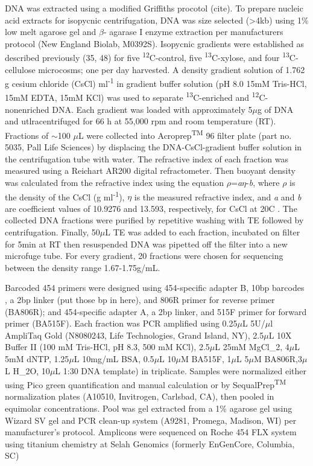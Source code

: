 DNA was extracted using a modified Griffiths procotol (cite). To prepare nucleic acid extracts for isopycnic centrifugation, DNA was size selected (>4kb) using 1\% low melt agarose gel and $\beta$- agarase I enzyme extraction per manufacturers protocol (New England Biolab, M0392S). Isopycnic gradients were established as described previously (35, 48) for five \textsuperscript{12}C-control, five \textsuperscript{13}C-xylose, and four \textsuperscript{13}C-cellulose microcosms; one per day harvested. A density gradient solution of 1.762 g cesium chloride (CsCl) ml\textsuperscript{-1} in gradient buffer solution (pH 8.0 15mM Tris-HCl, 15mM EDTA, 15mM KCl) was used to separate \textsuperscript{13}C-enriched and \textsuperscript{12}C-nonenriched DNA. Each gradient was loaded with approximately 5$\mu$g of DNA and utlracentrifuged for 66 h at 55,000 rpm and room temperature (RT). Fractions of $\sim$100 $\mu$L were collected into Acroprep\textsuperscript{TM} 96 filter plate (part no. 5035, Pall Life Sciences) by displacing the DNA-CsCl-gradient buffer solution in the centrifugation tube with water. The refractive index of each fraction was measured using a Reichart AR200 digital refractometer. Then buoyant density was calculated from the refractive index using the equation $\rho$=\textit{a}$\eta$-\textit{b}, where $\rho$ is the density of the CsCl (g ml\textsuperscript{-1}), $\eta$ is the measured refractive index, and \textit{a} and \textit{b} are coefficient values of 10.9276 and 13.593, respectively, for CsCl at 20{\textdegree}C \cite{9780408708036}. The collected DNA fractions were purified by repetitive washing with TE followed by centrifugation. Finally, 50$\mu$L TE was added to each fraction, incubated on filter for 5min at RT then resuspended DNA was pipetted off the filter into a new microfuge tube. For every gradient, 20 fractions were chosen for sequencing between the density range 1.67-1.75g/mL. 



Barcoded 454 primers were designed using 454-specific adapter B, 10bp barcodes \cite{Hamady_2008}, a 2bp linker (put those bp in here), and 806R primer for reverse primer (BA806R); and 454-specific adapter A, a 2bp linker, and 515F primer for forward primer (BA515F). Each fraction was PCR amplified using 0.25$\mu$L 5U/$\mu$l AmpliTaq Gold (N8080243, Life Technologies, Grand Island, NY), 2.5$\mu$L 10X Buffer II (100 mM Tris-HCl, pH 8.3, 500 mM KCl), 2.5$\mu$L 25mM MgCl_{2}, 4$\mu$L 5mM dNTP, 1.25$\mu$L 10mg/mL BSA, 0.5$\mu$L 10$\mu$M BA515F, 1$\mu$L 5$\mu$M BA806R,3$\mu$L H_{2}O, 10$\mu$L 1:30 DNA template) in triplicate. Samples were normalized either using Pico green quantification and manual calculation or by SequalPrep\textsuperscript{TM} normalization plates (A10510, Invitrogen, Carlsbad, CA), then pooled in equimolar concentrations.  Pool was gel extracted from a 1\% agarose gel using Wizard SV gel and PCR clean-up system (A9281, Promega, Madison, WI) per manufacturer's protocol.  Amplicons were sequenced on Roche 454 FLX system using titanium chemistry at Selah Genomics (formerly EnGenCore, Columbia, SC)  
